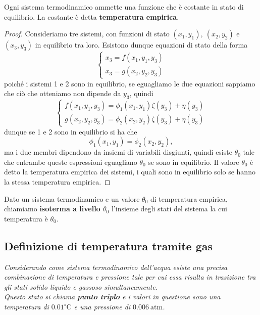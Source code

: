\begin{proposition}\label{TemperaturaEmpirica}
Ogni sistema termodinamico ammette una funzione che \`e costante in stato di equilibrio. La costante \`e detta \textbf{temperatura empirica}.
\end{proposition}
\begin{proof}
Consideriamo tre sistemi, con funzioni di stato $(x_1, y_1),\ (x_2,y_2)$ e $(x_3,y_3)$ in equilibrio tra loro. Esistono dunque equazioni di stato della forma
\[\begin{cases}
x_3=f(x_1,y_1,y_3)\\
x_3=g(x_2,y_2,y_3)
\end{cases}\]
poich\'e i sistemi 1 e 2 sono in equilibrio, se eguagliamo le due equazioni sappiamo che ci\`o che otteniamo non dipende da $y_3$, quindi
\[\begin{cases}
f(x_1,y_1,y_3)=\phi_1(x_1,y_1)\zeta(y_3)+\eta(y_3)\\
g(x_2,y_2,y_3)=\phi_2(x_2,y_2)\zeta(y_3)+\eta(y_3)
\end{cases}\]
dunque se 1 e 2 sono in equilibrio si ha che 
\[\phi_1(x_1,y_1)=\phi_2(x_2,y_2),\]
ma i due membri dipendono da insiemi di variabili disgiunti, quindi esiste $\theta_0$ tale che entrambe queste espressioni eguagliano $\theta_0$ se sono in equilibrio. Il valore $\theta_0$ \`e detto la temperatura empirica dei sistemi, i quali sono in equilibrio solo se hanno la stessa temperatura empirica.
\end{proof}

\begin{definition}[Isoterme]
Dato un sistema termodinamico e un valore $\theta_0$ di temperatura empirica, chiamiamo \textbf{isoterma a livello $\theta_0$} l'insieme degli stati del sistema la cui temperatura \`e $\theta_0$.
\end{definition}


\subsection{Definizione di temperatura tramite gas}
\begin{fact}
\emph{Considerando come sistema termodinamico dell'acqua esiste una precisa combinazione di temperatura e pressione tale per cui essa risulta in trasizione tra gli stati solido liquido e gassoso simultaneamente.\\
Questo stato si chiama \textbf{punto triplo} e i valori in questione sono una temperatura di $0.01 ^\circ \mathrm{C}$ e una pressione di $0.006\ \mathrm{atm}$.}
\end{fact}
\medskip

